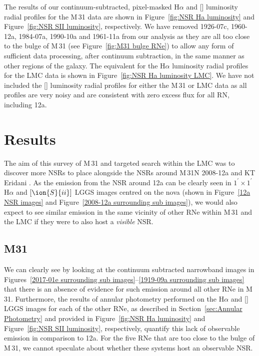 \documentclass[fleqn,usenatbib]{mnras}
\begin{document}
The results of our continuum-subtracted, pixel-masked H$\alpha$ and [] luminosity radial profiles for the M\,31 data are shown in Figure~\ref{fig:NSR Ha luminosity} and Figure~\ref{fig:NSR SII luminosity}, respectively. We have removed 1926-07c, 1960-12a, 1984-07a, 1990-10a and 1961-11a from our analysis as they are all too close to the bulge of M\,31 (see Figure~\ref{fig:M31 bulge RNe}) to allow any form of sufficient data processing, after continuum subtraction, in the same manner as other regions of the galaxy. The equivalent for the H$\alpha$ luminosity radial profiles for the LMC data is shown in Figure~\ref{fig:NSR Ha luminosity LMC}. We have not included the [] luminosity radial profiles for either the M\,31 or LMC data as all profiles are very noisy and are consistent with zero excess flux for all RN, including 12a.

\section{Results}\label{sec:Results}
The aim of this survey of M\,31 and targeted search within the LMC was to discover more NSRs to place alongside the NSRs around M\,31N 2008-12a \citep{2019Natur.565..460D,2023MNRAS.521.3004H} and KT Eridani \citep{2023arXiv231017055S,2023arXiv231017258H}. As the emission from the NSR around 12a can be clearly seen in $1^{\prime} \times 1^{\prime}$ H$\alpha$ and $[\ion{S}{ii}]$ LGGS images centred on the nova (shown in Figure~\ref{12a NSR images} and Figure~\ref{2008-12a surrounding sub images}), we would also expect to see similar emission in the same vicinity of other RNe within M\,31 and the LMC if they were to also host a {\it visible} NSR.

\subsection{M31}\label{sec:Results M31}
We can clearly see by looking at the continuum subtracted narrowband images in Figures~\ref{2017-01e surrounding sub images}--\ref{1919-09a surrounding sub images} that there is an absence of evidence for such emission around all other RNe in M\,31. Furthermore, the results of annular photometry performed on the H$\alpha$ and [] LGGS images for each of the other RNe, as described in Section~\ref{sec:Annular Photometry} and provided in Figure~\ref{fig:NSR Ha luminosity} and Figure~\ref{fig:NSR SII luminosity}, respectively, quantify this lack of observable emission in comparison to 12a. For the five RNe that are too close to the bulge of M\,31, we cannot speculate about whether these systems host an observable NSR. 
\end{document}
